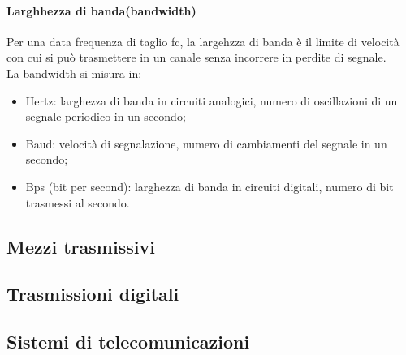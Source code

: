 \documentclass{subfiles}
\begin{document}
    \paragraph*{Larghhezza di banda(bandwidth)}
    Per una data frequenza di taglio fc, la largehzza di banda è il limite di velocità con cui si può trasmettere in un canale senza 
    incorrere in perdite di segnale.\\
    La bandwidth si misura in:
    \begin{itemize}
        \item Hertz: larghezza di banda in circuiti analogici, numero di oscillazioni di un segnale periodico in un secondo;
        \item Baud: velocità di segnalazione, numero di cambiamenti del segnale in un secondo;
        \item Bps (bit per second): larghezza di banda in circuiti digitali, numero di bit trasmessi al secondo.
    \end{itemize}




    \subsection{Mezzi trasmissivi}
    
    \clearpage

    \subsection{Trasmissioni digitali}

    \subsection{Sistemi di telecomunicazioni}
\end{document}
